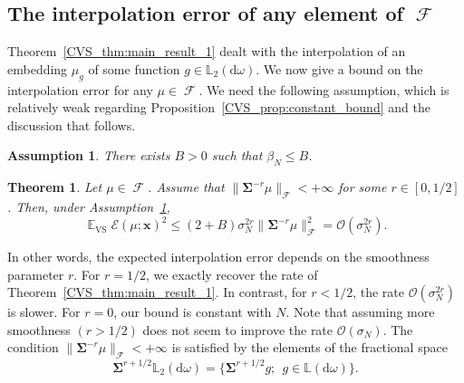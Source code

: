\documentclass[twoside,11pt]{book}
\newtheorem{theorem}{Theorem}
\newtheorem{assumption}{Assumption}
\numberwithin{theorem}{chapter}
\numberwithin{definition}{chapter}
\numberwithin{proposition}{chapter}
\numberwithin{corollary}{chapter}
\numberwithin{example}{chapter}
\numberwithin{lemma}{chapter}
\numberwithin{assumption}{chapter}
\numberwithin{equation}{chapter}
\numberwithin{figure}{chapter}
\DeclareMathOperator{\VS}{\mathrm{VS}}
\DeclareMathOperator{\EX}{\mathbb{E}}
\DeclareMathOperator{\F}{\mathcal{F}}
\def\Ltwo{\mathbb{L}_{2}(\mathrm{d} \omega)}
\begin{document}
\subsection{The interpolation error of any element of $\F$}\label{CVS_sec:main_theorems_2}
%
%
Theorem~\ref{CVS_thm:main_result_1} dealt with the interpolation of an embedding $\mu_{g}$ of some function $g\in\Ltwo$. We now give a bound on the interpolation error for any $\mu\in\F$. We need the following assumption, which is relatively weak regarding Proposition~\ref{CVS_prop:constant_bound} and the discussion that follows.

\begin{assumption}\label{CVS_hyp:beta_N_bounded}
	There exists $B >0$ such that $\beta_{N} \leq B$.
\end{assumption}

\begin{theorem}\label{CVS_thm:slow_rates}
Let $\mu \in \F$.
Assume that $\|\bm{\Sigma}^{-r}\mu \|_{\F} < +\infty$ for some $r \in [0,1/2]$. Then, under Assumption~\ref{CVS_hyp:beta_N_bounded},
\begin{equation}
\EX_{\VS} \mathcal{E}(\mu;\bm{x})^{2} \leq (2+B) \sigma_{N}^{2r} \|\bm{\Sigma}^{-r} \mu\|_{\F}^{2} = \mathcal{O}(\sigma_{N}^{2r}). \nonumber
\end{equation}
%
\end{theorem}
%
%
In other words, the expected interpolation error depends on the smoothness parameter $r$. For $r =1/2$, we exactly recover the rate of Theorem~\ref{CVS_thm:main_result_1}. In contrast, for $r<1/2$, the rate $\mathcal{O}(\sigma_{N}^{2r})$ is slower. For $r=0$, our bound is constant with $N$. Note that assuming more smoothness $(r>1/2)$ does not seem to improve the rate $\mathcal{O}(\sigma_{N})$. The condition $\|\bm{\Sigma}^{-r}\mu \|_{\F} < +\infty$ is satisfied by the elements of the fractional space
\begin{equation}
\bm{\Sigma}^{r+1/2} \mathbb{L}_{2}(\mathrm{d}\omega) = \Big\{\bm{\Sigma}^{r+1/2} g; \:\: g \in \mathbb{L}(\mathrm{d}\omega)  \Big\}.
\end{equation}
\end{document}

